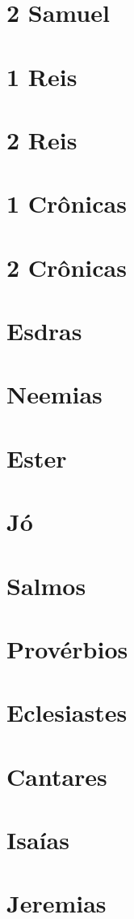 \documentclass[a4paper,11pt,oneside]{book}
\theoremstyle{definition}
\theoremstyle{break}
\begin{document}
\chapter{2 Samuel}
\chapter{1 Reis}
\chapter{2 Reis}
\chapter{1 Crônicas}
\chapter{2 Crônicas}
\chapter{Esdras}
\chapter{Neemias}
\chapter{Ester}
\chapter{Jó}
\chapter{Salmos}
\chapter{Provérbios}
\chapter{Eclesiastes}
\chapter{Cantares}
\chapter{Isaías}
\chapter{Jeremias}
\end{document}
